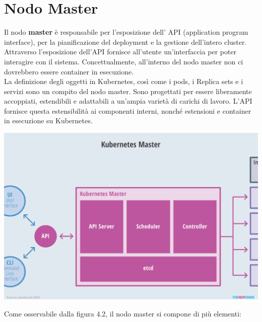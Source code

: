 \documentclass[12pt, a4paper]{report}
\begin{document}
\section{Nodo Master}
Il nodo \textbf{master} è responsabile per l'esposizione dell' API (application program interface), per la pianificazione del deployment e la gestione dell'intero cluster. Attraverso l'esposizione dell'API fornisce all'utente un'interfaccia per poter interagire con il sistema. Concettualmente, all'interno del nodo master non ci dovrebbero essere container in esecuzione.\\
La definizione degli oggetti in Kubernetes, così come i pods, i Replica sets e i servizi sono un compito del nodo master. Sono progettati per essere liberamente accoppiati, estendibili e adattabili a un'ampia varietà di carichi di lavoro. L'API fornisce questa estensibilità ai componenti interni, nonché estensioni e container in esecuzione su Kubernetes.
\begin{center}
  \includegraphics[scale=0.5]{Images/Kubernetes-master}
\end{center}
Come osservabile dalla figura 4.2, il nodo master si compone di più elementi:
\end{document}
